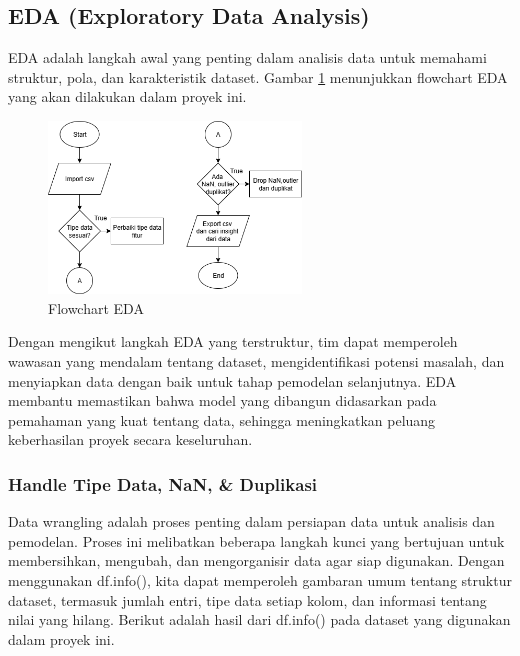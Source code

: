 \subsection{EDA (Exploratory Data Analysis)}
EDA adalah langkah awal yang penting dalam analisis data untuk memahami struktur, pola, dan karakteristik dataset. Gambar \ref{fig:eda1} menunjukkan flowchart EDA yang akan dilakukan dalam proyek ini.

\begin{figure}[H]
    \centering
    \includegraphics[width=0.6\textwidth]{gambar/flowchartEDA.png}
    \caption{Flowchart EDA}
    \label{fig:eda1}
\end{figure}

Dengan mengikut langkah EDA yang terstruktur, tim dapat memperoleh wawasan yang mendalam tentang dataset, mengidentifikasi potensi masalah, dan menyiapkan data dengan baik untuk tahap pemodelan selanjutnya. EDA membantu memastikan bahwa model yang dibangun didasarkan pada pemahaman yang kuat tentang data, sehingga meningkatkan peluang keberhasilan proyek secara keseluruhan.

\subsubsection{Handle Tipe Data, NaN, \& Duplikasi}
Data wrangling adalah proses penting dalam persiapan data untuk analisis dan pemodelan. Proses ini melibatkan beberapa langkah kunci yang bertujuan untuk membersihkan, mengubah, dan mengorganisir data agar siap digunakan. Dengan menggunakan df.info(), kita dapat memperoleh gambaran umum tentang struktur dataset, termasuk jumlah entri, tipe data setiap kolom, dan informasi tentang nilai yang hilang. Berikut adalah hasil dari df.info() pada dataset yang digunakan dalam proyek ini.

